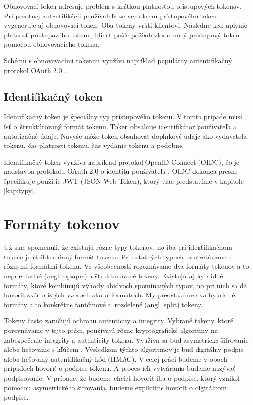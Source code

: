 Obnovovací token adresuje problém s krátkou platnosťou prístupových tokenov. Pri prvotnej autentifikácii používateľa server okrem prístupového tokenu vygeneruje aj obnovovací token. Oba tokeny vráti klientovi. Následne keď uplynie platnosť prístupového tokenu, klient pošle požiadavku o nový prístupový token pomocou obnovovacieho tokenu. 

Schému s obnovovacími tokenmi využíva napríklad populárny autentifikačný protokol OAuth 2.0 \cite{oauth2}.


\subsection{Identifikačný token}

Identifikačný token je špeciálny typ prístupového tokenu. V tomto prípade musí ísť o~štruktúrovaný formát tokenu. Token obsahuje identifikátor používateľa a autorizačné údaje. Navyše môže token obsahovať doplnkové údaje ako vydavateľa tokenu, čas platnosti tokenu, čas vydania tokenu a podobne.

Identifikačný token využíva napríklad protokol OpenID Connect (OIDC), čo je nadstavba protokolu OAuth 2.0 o identitu používateľa \cite{oidc}. OIDC dokonca presne špecifikuje použitie JWT (JSON Web Token), ktorý viac predstavíme v kapitole \ref{kap:typy}.


\section{Formáty tokenov}
\label{sec:formats}

Už sme spomenuli, že existujú rôzne typy tokenov, no iba pri identifikačnom tokene je striktne daný formát tokenu. Pri ostatných typoch sa stretávame s rôznymi formátmi tokenu. Vo všeobecnosti rozoznávame dva formáty tokenov a to nepriehľadné (angl. opaque) a štruktúrované tokeny. Existujú aj hybridné formáty, ktoré kombinujú výhody obidvoch spomínaných typov, no pri nich sa dá hovoriť skôr o istých vzoroch ako o~formátoch. My predstavíme dva hybridné formáty a to konkrétne fantómové a~rozdelené (angl. split) tokeny.

Tokeny často zaručujú ochranu autenticity a integrity. Vybrané tokeny, ktoré porovnávame v tejto práci, používajú rôzne kryptografické algoritmy na zabezpečenie integrity a autenticity tokenu. Využíva sa buď asymetrické šifrovanie alebo hešovanie s kľúčom \cite{hmac_povodny}. Výsledkom týchto algoritmov je buď digitálny podpis alebo hešovaný autentifikačný kód (HMAC). V celej práci budeme v oboch prípadoch hovoriť o podpise tokenu. A proces ich vytvárania budeme nazývať podpisovanie. V prípade, že budeme chcieť hovoriť iba o podpise, ktorý vznikol pomocou asymetrického šifrovania, budeme explicitne hovoriť o digitálnom podpise.

